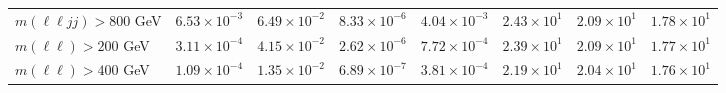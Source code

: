 \begin{table}[htp]
{\begin{tabular}{l | c c c c | c c c}
      $m(\ell\ell jj) > 800$ GeV & $6.53 \times 10^{-3}$ & $6.49 \times 10^{-2}$ & $8.33 \times 10^{-6}$ & $4.04 \times 10^{-3}$ & $2.43 \times 10^{1}$ & $2.09 \times 10^{1}$ & $1.78 \times 10^{1}$ \\
      $m(\ell\ell) > 200$ GeV & $3.11 \times 10^{-4}$ & $4.15 \times 10^{-2}$ & $2.62 \times 10^{-6}$ & $7.72 \times 10^{-4}$ & $2.39 \times 10^{1}$ & $2.09 \times 10^{1}$ & $1.77 \times 10^{1}$ \\
      $m(\ell\ell) > 400$ GeV & $1.09 \times 10^{-4}$ & $1.35 \times 10^{-2}$ & $6.89 \times 10^{-7}$ & $3.81 \times 10^{-4}$ & $2.19 \times 10^{1}$ & $2.04 \times 10^{1}$ & $1.76 \times 10^{1}$ \\
      \hline
    \end{tabular}
  }
\end{table}
